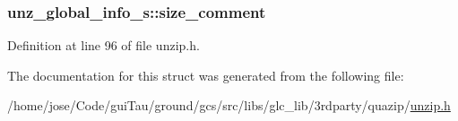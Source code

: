 \hypertarget{structunz__global__info__s_a10b58ab57b62301de813ecac0e974363}{
\subsubsection[{size\-\_\-comment}]{ unz\-\_\-global\-\_\-info\-\_\-s\-::size\-\_\-comment}}\label{structunz__global__info__s_a10b58ab57b62301de813ecac0e974363}


Definition at line 96 of file unzip.\-h.



The documentation for this struct was generated from the following file\-:\begin{DoxyCompactItemize}
\item 
/home/jose/\-Code/gui\-Tau/ground/gcs/src/libs/glc\-\_\-lib/3rdparty/quazip/\hyperlink{unzip_8h}{unzip.\-h}\end{DoxyCompactItemize}
